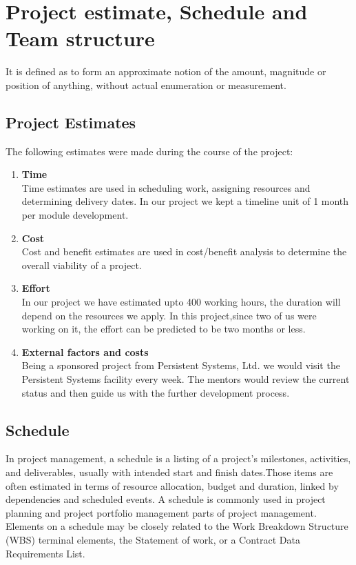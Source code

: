 \documentclass{SureshLimkar}
\begin{document}
\section{Project estimate, Schedule and Team structure}

\hspace{0.5 in}It is defined as to form an approximate notion of the amount, magnitude or position of anything, without actual enumeration or measurement.
\\

\subsection{Project Estimates}
\hspace{0.5 in}The following estimates were made during the course of the project:
\begin{enumerate}
 \item \textbf{Time} \\ Time estimates are used in scheduling work, assigning resources and determining delivery dates. In our project we kept a timeline unit of 1 month per module development.
 \item \textbf{Cost} \\Cost and benefit estimates are used in cost/benefit analysis to determine the overall viability of a project.
 \item \textbf{Effort}\\In our project we have estimated upto 400 working hours, the duration will depend on the resources we apply. In this project,since two of us were working on it, the effort can be predicted to be two months or less.
 \item \textbf{External factors and costs}\\ Being a sponsored project from Persistent Systems, Ltd. we would visit the Persistent Systems facility every week. The mentors would review the current status and then guide us with the further development process. 
 
\end{enumerate}

\subsection{Schedule}
\hspace{0.5 in}In project management, a schedule is a listing of a project’s milestones, activities, and deliverables, usually with intended start and finish dates.Those items are often estimated in terms of resource allocation, budget and duration, linked by dependencies and scheduled events. A schedule is commonly used in project planning and project portfolio management parts of project management. Elements on a schedule may be closely related to the Work Breakdown Structure (WBS) terminal elements, the Statement of work, or a Contract Data Requirements List.
\\
\newpage
\end{document}

